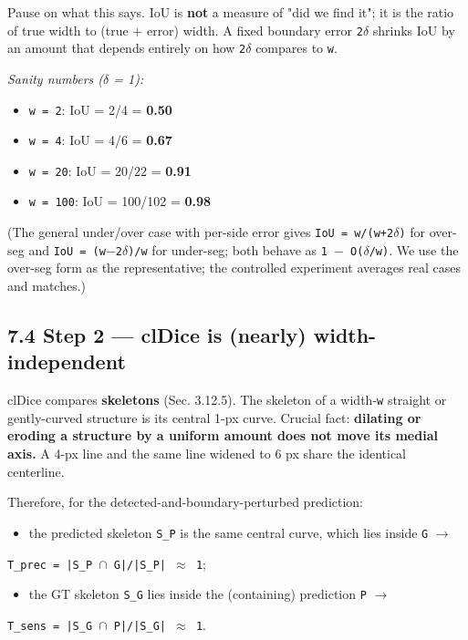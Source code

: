\documentclass[11pt]{article}
\begin{document}
Pause on what this says. IoU is \textbf{not} a measure of "did we find it"; it is the ratio of true width to (true + error) width. A fixed boundary error \texttt{2$\delta$} shrinks IoU by an amount that depends entirely on how \texttt{2$\delta$} compares to \texttt{w}.

\textit{Sanity numbers ($\delta$ = 1):}
\begin{itemize}\setlength{\itemsep}{1pt}
\item \texttt{w = 2}: IoU = 2/4 = \textbf{0.50}
\item \texttt{w = 4}: IoU = 4/6 = \textbf{0.67}
\item \texttt{w = 20}: IoU = 20/22 = \textbf{0.91}
\item \texttt{w = 100}: IoU = 100/102 = \textbf{0.98}
\end{itemize}

(The general under/over case with per-side error gives \texttt{IoU = w/(w+2$\delta$)} for over-seg and \texttt{IoU = (w$-$2$\delta$)/w} for under-seg; both behave as \texttt{1 $-$ O($\delta$/w)}. We use the over-seg form as the representative; the controlled experiment averages real cases and matches.)

\subsection*{7.4 Step 2 --- clDice is (nearly) width-independent}

clDice compares \textbf{skeletons} (Sec. 3.12.5). The skeleton of a width-\texttt{w} straight or gently-curved structure is its central 1-px curve. Crucial fact: \textbf{dilating or eroding a structure by a uniform amount does not move its medial axis.} A 4-px line and the same line widened to 6 px share the identical centerline.

Therefore, for the detected-and-boundary-perturbed prediction:
\begin{itemize}\setlength{\itemsep}{1pt}
\item the predicted skeleton \texttt{S\_P} is the same central curve, which lies inside \texttt{G} $\rightarrow$
\end{itemize}
  \texttt{T\_prec = |S\_P $\cap$ G|/|S\_P| $\approx$ 1};
\begin{itemize}\setlength{\itemsep}{1pt}
\item the GT skeleton \texttt{S\_G} lies inside the (containing) prediction \texttt{P} $\rightarrow$
\end{itemize}
  \texttt{T\_sens = |S\_G $\cap$ P|/|S\_G| $\approx$ 1}.
\end{document}
